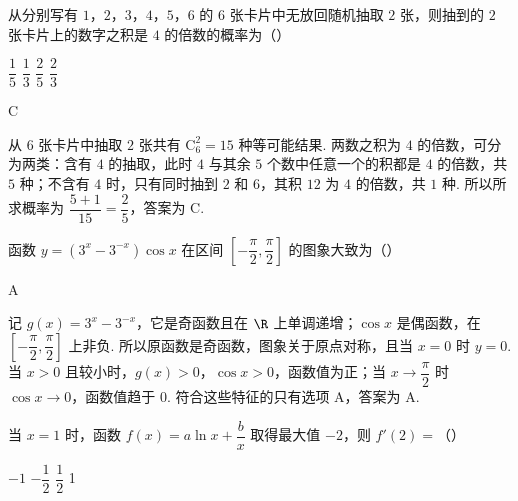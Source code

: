 \begin{problem}
从分别写有 \(1\)，\(2\)，\(3\)，\(4\)，\(5\)，\(6\) 的 \(6\) 张卡片中无放回随机抽取 \(2\) 张，则抽到的 \(2\) 张卡片上的数字之积是 \(4\) 的倍数的概率为（\quad）

\choices
    {\(\dfrac{1}{5}\)}
    {\(\dfrac{1}{3}\)}
    {\(\dfrac{2}{5}\)}
    {\(\dfrac{2}{3}\)}
\end{problem}

\begin{answer}
C
\end{answer}

\begin{solution}
从 \(6\) 张卡片中抽取 \(2\) 张共有 \(\mathrm C_6^2=15\) 种等可能结果. 两数之积为 \(4\) 的倍数，可分为两类：含有 \(4\) 的抽取，此时 \(4\) 与其余 \(5\) 个数中任意一个的积都是 \(4\) 的倍数，共 \(5\) 种；不含有 \(4\) 时，只有同时抽到 \(2\) 和 \(6\)，其积 \(12\) 为 \(4\) 的倍数，共 \(1\) 种. 所以所求概率为 \(\dfrac{5+1}{15}=\dfrac25\)，答案为 C.
\end{solution}

\begin{problem}
函数 \(y=\left(3^x-3^{-x}\right)\cos x\) 在区间 \(\left[-\dfrac{\pi}{2},\dfrac{\pi}{2}\right]\) 的图象大致为（\quad）

    {}
    {}
    {}
\end{problem}

\begin{answer}
A
\end{answer}

\begin{solution}
记 \(g(x)=3^x-3^{-x}\)，它是奇函数且在 \(\R\) 上单调递增；\(\cos x\) 是偶函数，在 \(\left[-\dfrac{\pi}{2},\dfrac{\pi}{2}\right]\) 上非负. 所以原函数是奇函数，图象关于原点对称，且当 \(x=0\) 时 \(y=0\). 当 \(x>0\) 且较小时，\(g(x)>0\)，\(\cos x>0\)，函数值为正；当 \(x\to\dfrac{\pi}{2}\) 时 \(\cos x\to0\)，函数值趋于 \(0\). 符合这些特征的只有选项 A，答案为 A.
\end{solution}

\begin{problem}
当 \(x=1\) 时，函数 \(f(x)=a\ln x+\dfrac{b}{x}\) 取得最大值 \(-2\)，则 \(f'(2)=\)（\quad）

\choices
    {\(-1\)}
    {\(-\dfrac{1}{2}\)}
    {\(\dfrac{1}{2}\)}
    {1}
\end{problem}


